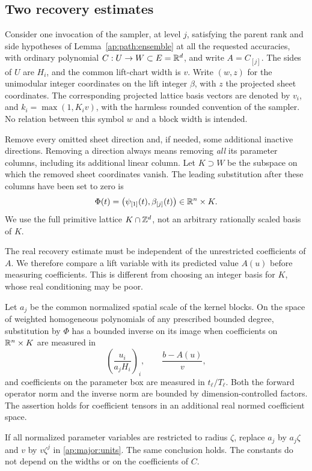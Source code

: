 \subsection{Two recovery estimates}

Consider one invocation of the sampler, at level $j$, satisfying
the parent rank and side hypotheses of Lemma~\ref{ap:path:ensemble}
at all the requested accuracies, with ordinary
polynomial $C:U\to W\subset E=\mathbb R^d$, and write $A=C_{[j]}$.  The sides
of $U$ are $H_i$, and the common lift-chart width is $v$.  Write
$(w,z)$ for the unimodular integer coordinates on the lift integer
$\beta$, with $z$ the projected sheet coordinates.  The corresponding
projected lattice basis vectors are denoted by $v_i$, and
$k_i=\max(1,K_i v)$, with the harmless rounded convention of the
sampler.  No relation between this symbol $w$ and a block width is
intended.

Remove every omitted sheet direction and, if needed, some additional
inactive directions.  Removing a direction always means removing
\emph{all} its parameter columns, including its additional linear
column.  Let $K\supset W$ be the subspace on which the removed sheet
coordinates vanish.  The leading substitution after these columns
have been set to zero is
\[
 \Phi(t)=\bigl(\psi_{[1]}(t),\beta_{[j]}(t)\bigr)
       \in\mathbb R^n\times K.
\]
We use the full primitive lattice $K\cap\mathbb Z^d$, not an arbitrary
rationally scaled basis of $K$.

The real recovery estimate must be independent of the unrestricted
coefficients of $A$. We therefore compare a lift variable with its
predicted value $A(u)$ before measuring coefficients. This is
different from choosing an integer basis for $K$, whose real
conditioning may be poor.

\begin{lemma}\label{ap:major:real-recovery}
Let $a_j$ be the common normalized spatial scale of the kernel blocks.
On the space of weighted homogeneous polynomials of any prescribed
bounded degree, substitution by $\Phi$ has a bounded inverse on its
image when coefficients on $\mathbb R^n\times K$ are measured in
\begin{equation}\label{ap:major:units}
       \left(\frac{u_i}{a_jH_i}\right)_i,
       \qquad \frac{b-A(u)}{v},
\end{equation}
and coefficients on the parameter box are measured in $t_\ell/T_\ell$.
Both the forward operator norm and the inverse norm are bounded by
dimension-controlled factors.  The assertion holds for coefficient
tensors in an additional real normed coefficient space.

If all normalized parameter variables are restricted to radius $\zeta$,
replace $a_j$ by $a_j\zeta$ and $v$ by $v\zeta^j$ in
\eqref{ap:major:units}.  The same conclusion holds.  The constants do
not depend on the widths or on the coefficients of $C$.
\end{lemma}

